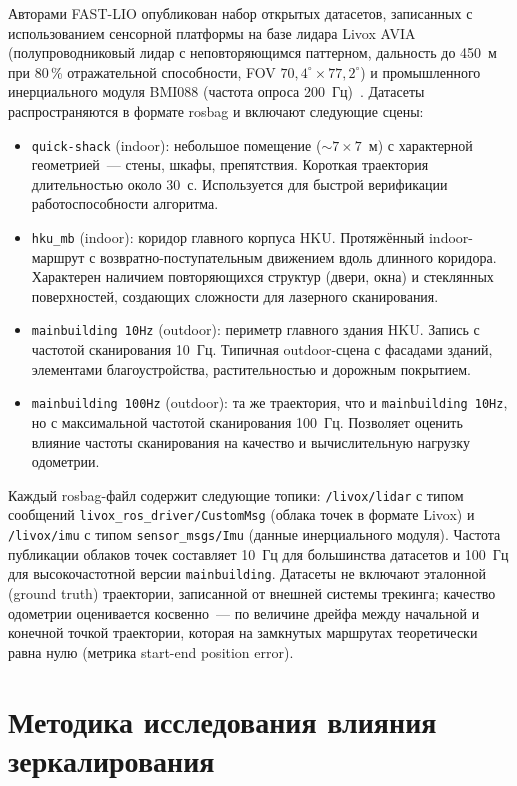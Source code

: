 \documentclass{misisarticle}
\begin{document}
Авторами FAST-LIO опубликован набор открытых датасетов, записанных с использованием сенсорной платформы на базе лидара Livox AVIA (полупроводниковый лидар с неповторяющимся паттерном, дальность до 450~м при 80\,\% отражательной способности, FOV $70{,}4^\circ\times77{,}2^\circ$) и промышленного инерциального модуля BMI088 (частота опроса 200~Гц)~\cite{xu2021,xu2022}. Датасеты распространяются в формате rosbag и включают следующие сцены:
\begin{itemize}
  \item \texttt{quick-shack} (indoor): небольшое помещение ($\sim7\times7$~м) с характерной геометрией~--- стены, шкафы, препятствия. Короткая траектория длительностью около 30~с. Используется для быстрой верификации работоспособности алгоритма.
  \item \texttt{hku\_mb} (indoor): коридор главного корпуса HKU. Протяжённый indoor-маршрут с возвратно-поступательным движением вдоль длинного коридора. Характерен наличием повторяющихся структур (двери, окна) и стеклянных поверхностей, создающих сложности для лазерного сканирования.
  \item \texttt{mainbuilding 10Hz} (outdoor): периметр главного здания HKU. Запись с частотой сканирования 10~Гц. Типичная outdoor-сцена с фасадами зданий, элементами благоустройства, растительностью и дорожным покрытием.
  \item \texttt{mainbuilding 100Hz} (outdoor): та же траектория, что и \texttt{mainbuilding 10Hz}, но с максимальной частотой сканирования 100~Гц. Позволяет оценить влияние частоты сканирования на качество и вычислительную нагрузку одометрии.
\end{itemize}

Каждый rosbag-файл содержит следующие топики: \texttt{/livox/lidar} с типом сообщений \texttt{livox\_ros\_driver/CustomMsg} (облака точек в формате Livox) и \texttt{/livox/imu} с типом \texttt{sensor\_msgs/Imu} (данные инерциального модуля). Частота публикации облаков точек составляет 10~Гц для большинства датасетов и 100~Гц для высокочастотной версии \texttt{mainbuilding}. Датасеты не включают эталонной (ground truth) траектории, записанной от внешней системы трекинга; качество одометрии оценивается косвенно~--- по величине дрейфа между начальной и конечной точкой траектории, которая на замкнутых маршрутах теоретически равна нулю (метрика start-end position error).

\section{Методика исследования влияния зеркалирования}
\end{document}

